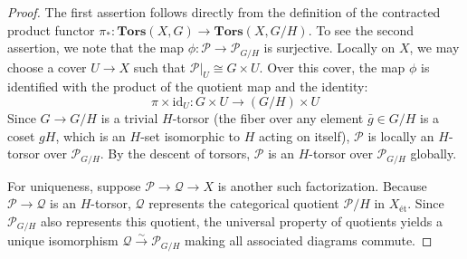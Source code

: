 \begin{proof}
    The first assertion follows directly from the definition of the contracted product functor $\pi_*: \mathbf{Tors}(X, G) \to \mathbf{Tors}(X, G/H)$. To see the second assertion, we note that the map $\phi: \mathcal{P} \to \mathcal{P}_{G/H}$ is surjective. Locally on $X$, we may choose a cover $U \to X$ such that $\mathcal{P}|_U \cong G \times U$. 
    Over this cover, the map $\phi$ is identified with the product of the quotient map and the identity:
    \[ \pi \times \text{id}_U: G \times U \to (G/H) \times U \]
    Since $G \to G/H$ is a trivial $H$-torsor (the fiber over any element $\bar{g} \in G/H$ is a coset $gH$, which is an $H$-set isomorphic to $H$ acting on itself), $\mathcal{P}$ is locally an $H$-torsor over $\mathcal{P}_{G/H}$. By the descent of torsors, $\mathcal{P}$ is an $H$-torsor over $\mathcal{P}_{G/H}$ globally.

    For uniqueness, suppose $\mathcal{P} \to \mathcal{Q} \to X$ is another such factorization. Because $\mathcal{P} \to \mathcal{Q}$ is an $H$-torsor, $\mathcal{Q}$ represents the categorical quotient $\mathcal{P}/H$ in $X_{\text{ét}}$. Since $\mathcal{P}_{G/H}$ also represents this quotient, the universal property of quotients yields a unique isomorphism $\mathcal{Q} \xrightarrow{\sim} \mathcal{P}_{G/H}$ making all associated diagrams commute.

\end{proof}


